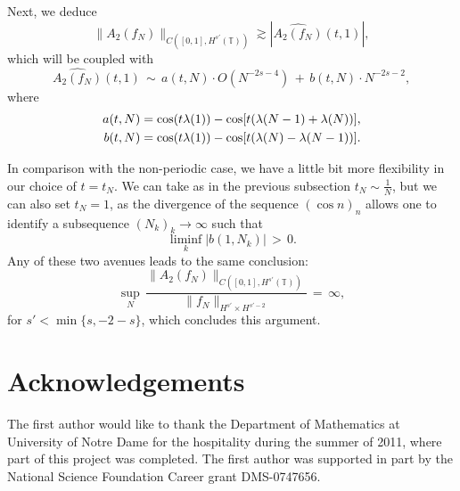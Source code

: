 \documentclass{amsart}
\begin{document}
Next, we deduce
\[
\|A_2(f_N)\|_{C([0,1], H^{s'}(\mathbb{T}))} \gtrsim \left|\widehat{A_2(f_N)}(t,1)\right|,
\]
which will be coupled with
\[
\widehat{A_2(f_N)}(t,1)\,\sim\,a(t,N)\cdot O(N^{-2s-4})\,+\,b(t,N)\cdot N^{-2s-2},
\]
where
\[\aligned
a(t,N)&= \cos (t\lambda(1))-\cos[t(\lambda(N-1) + \lambda(N))],\\ b(t,N)&= \cos (t\lambda(1))-\cos[t(\lambda(N) - \lambda(N-1))].
\endaligned
\]

In comparison with the non-periodic case, we have a little bit more flexibility in our choice of $t=t_N$. We can take as in the previous subsection $t_N \sim \frac{1}{N}$, but we can also set $t_N=1$, as the divergence of the sequence $(\cos n)_n$ allows one to identify a subsequence $(N_k)_k\to\infty$ such that 
\[
\liminf_k \left|b(1, N_k)\right|\,>\,0.
\]
Any of these two avenues leads to the same conclusion:
\[
\sup_N\,\frac{\|A_2(f_N)\|_{C([0,1], H^{s'}(\mathbb{T}))}}{\|f_N\|_{H^{s'}\times H^{s'-2}}}\,=\,\infty,\]
for $s'<\min\{s,-2-s\}$, which concludes this argument.

\section*{Acknowledgements}
The first author would like to thank the Department of Mathematics at University of Notre Dame for the hospitality during the summer of 2011, where part of this project was completed. The first author was supported in part by the National Science Foundation Career grant DMS-0747656.



\end{document}
